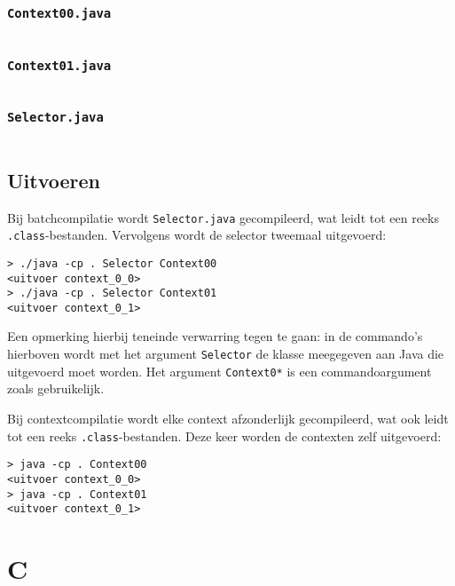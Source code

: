 \subsubsection{\texttt{Context00.java}}

\inputminted{java}{sources/echo/Context00.java}

\subsubsection{\texttt{Context01.java}}

\inputminted{java}{sources/echo/Context01.java}

\subsubsection{\texttt{Selector.java}}

\inputminted{java}{sources/echo/Selector.java}

\subsection{Uitvoeren}\label{subsec:echo-java-uitvoeren}

Bij batchcompilatie wordt \texttt{Selector.java} gecompileerd, wat leidt tot een reeks \texttt{.class}-bestanden.
Vervolgens wordt de selector tweemaal uitgevoerd:

\begin{verbatim}
> ./java -cp . Selector Context00
<uitvoer context_0_0>
> ./java -cp . Selector Context01
<uitvoer context_0_1>
\end{verbatim}

Een opmerking hierbij teneinde verwarring tegen te gaan: in de commando's hierboven wordt met het argument \texttt{Selector} de klasse meegegeven aan Java die uitgevoerd moet worden.
Het argument \texttt{Context0*} is een commandoargument zoals gebruikelijk.

Bij contextcompilatie wordt elke context afzonderlijk gecompileerd, wat ook leidt tot een reeks \texttt{.class}-bestanden.
Deze keer worden de contexten zelf uitgevoerd:

\begin{verbatim}
> java -cp . Context00
<uitvoer context_0_0>
> java -cp . Context01
<uitvoer context_0_1>
\end{verbatim}

\section{C}\label{sec:echo-c}

